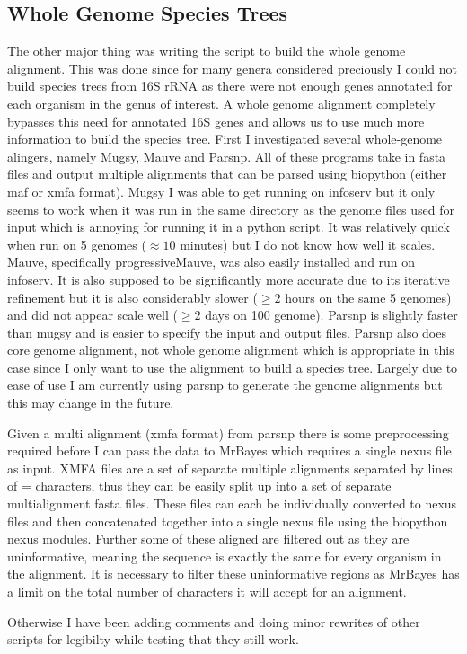\documentclass[12pt,letter]{article}
\begin{document}
\subsection{Whole Genome Species Trees}
The other major thing was writing the script to build the whole genome alignment.
This was done since for many genera considered preciously I could not build species trees from 16S rRNA as there were not enough genes annotated for each organism in the genus of interest.
A whole genome alignment completely bypasses this need for annotated 16S genes and allows us to use much more information to build the species tree.
First I investigated several whole-genome alingers, namely Mugsy, Mauve and Parsnp.
All of these programs take in fasta files and output multiple alignments that can be parsed using biopython (either maf or xmfa format).
Mugsy I was able to get running on infoserv but it only seems to work when it was run in the same directory as the genome files used for input which is annoying for running it in a python script.
It was relatively quick when run on 5 genomes ($\approx 10$ minutes) but I do not know how well it scales.
Mauve, specifically progressiveMauve, was also easily installed and run on infoserv.
It is also supposed to be significantly more accurate due to its iterative refinement but it is also considerably slower ($\geq 2$ hours on the same 5 genomes) and did not appear scale well ($\geq 2$ days on 100 genome).
Parsnp is slightly faster than mugsy and is easier to specify the input and output files.
Parsnp also does core genome alignment, not whole genome alignment which is appropriate in this case since I only want to use the alignment to build a species tree.
Largely due to ease of use I am currently using parsnp to generate the genome alignments but this may change in the future.\par
Given a multi alignment (xmfa format) from parsnp there is some preprocessing required before I can pass the data to MrBayes which requires a single nexus file as input.
XMFA files are a set of separate multiple alignments separated by lines of = characters, thus they can be easily split up into a set of separate multialignment fasta files.
These files can each be individually converted to nexus files and then concatenated together into a single nexus file using the biopython nexus modules.
Further some of these aligned are filtered out as they are uninformative, meaning the sequence is exactly the same for every organism in the alignment.
It is necessary to filter these uninformative regions as MrBayes has a limit on the total number of characters it will accept for an alignment.
\par
Otherwise I have been adding comments and doing minor rewrites of other scripts for legibilty while testing that they still work.
\end{document}
